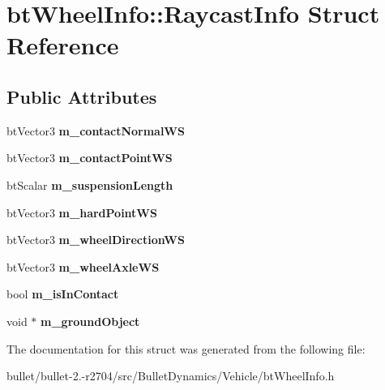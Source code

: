 \hypertarget{structbt_wheel_info_1_1_raycast_info}{\section{bt\+Wheel\+Info\+:\+:Raycast\+Info Struct Reference}
\label{structbt_wheel_info_1_1_raycast_info}
}
\subsection*{Public Attributes}
\begin{DoxyCompactItemize}
\item 
\hypertarget{structbt_wheel_info_1_1_raycast_info_adc58f3c5e33effc66e5053ab7dbac97e}{bt\+Vector3 {\bfseries m\+\_\+contact\+Normal\+W\+S}}\label{structbt_wheel_info_1_1_raycast_info_adc58f3c5e33effc66e5053ab7dbac97e}

\item 
\hypertarget{structbt_wheel_info_1_1_raycast_info_a1ceb3b86560dbc522c2ae561d391f862}{bt\+Vector3 {\bfseries m\+\_\+contact\+Point\+W\+S}}\label{structbt_wheel_info_1_1_raycast_info_a1ceb3b86560dbc522c2ae561d391f862}

\item 
\hypertarget{structbt_wheel_info_1_1_raycast_info_a1445bf7ab2e44074441aab67201b1ba1}{bt\+Scalar {\bfseries m\+\_\+suspension\+Length}}\label{structbt_wheel_info_1_1_raycast_info_a1445bf7ab2e44074441aab67201b1ba1}

\item 
\hypertarget{structbt_wheel_info_1_1_raycast_info_a830900f74e600cceb69359c7ad3f2a91}{bt\+Vector3 {\bfseries m\+\_\+hard\+Point\+W\+S}}\label{structbt_wheel_info_1_1_raycast_info_a830900f74e600cceb69359c7ad3f2a91}

\item 
\hypertarget{structbt_wheel_info_1_1_raycast_info_a533049ce1763d2f53e7063d96f406271}{bt\+Vector3 {\bfseries m\+\_\+wheel\+Direction\+W\+S}}\label{structbt_wheel_info_1_1_raycast_info_a533049ce1763d2f53e7063d96f406271}

\item 
\hypertarget{structbt_wheel_info_1_1_raycast_info_a0e4312377529bd15f081a2af9cc02b22}{bt\+Vector3 {\bfseries m\+\_\+wheel\+Axle\+W\+S}}\label{structbt_wheel_info_1_1_raycast_info_a0e4312377529bd15f081a2af9cc02b22}

\item 
\hypertarget{structbt_wheel_info_1_1_raycast_info_a29c172936558437da29af8fef741afda}{bool {\bfseries m\+\_\+is\+In\+Contact}}\label{structbt_wheel_info_1_1_raycast_info_a29c172936558437da29af8fef741afda}

\item 
\hypertarget{structbt_wheel_info_1_1_raycast_info_aa660acf5de607b62263165e010f531cc}{void $\ast$ {\bfseries m\+\_\+ground\+Object}}\label{structbt_wheel_info_1_1_raycast_info_aa660acf5de607b62263165e010f531cc}

\end{DoxyCompactItemize}


The documentation for this struct was generated from the following file\+:\begin{DoxyCompactItemize}
\item 
bullet/bullet-\/2.-\/r2704/src/\+Bullet\+Dynamics/\+Vehicle/bt\+Wheel\+Info.\+h\end{DoxyCompactItemize}
